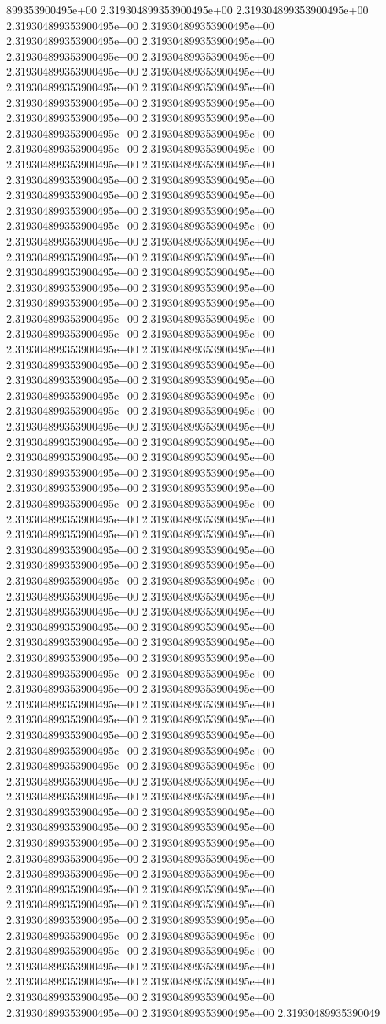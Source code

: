 899353900495e+00	2.319304899353900495e+00	2.319304899353900495e+00	2.319304899353900495e+00	2.319304899353900495e+00	2.319304899353900495e+00	2.319304899353900495e+00	2.319304899353900495e+00	2.319304899353900495e+00	2.319304899353900495e+00	2.319304899353900495e+00	2.319304899353900495e+00	2.319304899353900495e+00	2.319304899353900495e+00	2.319304899353900495e+00	2.319304899353900495e+00	2.319304899353900495e+00	2.319304899353900495e+00	2.319304899353900495e+00	2.319304899353900495e+00	2.319304899353900495e+00	2.319304899353900495e+00	2.319304899353900495e+00	2.319304899353900495e+00	2.319304899353900495e+00	2.319304899353900495e+00	2.319304899353900495e+00	2.319304899353900495e+00	2.319304899353900495e+00	2.319304899353900495e+00	2.319304899353900495e+00	2.319304899353900495e+00	2.319304899353900495e+00	2.319304899353900495e+00	2.319304899353900495e+00	2.319304899353900495e+00	2.319304899353900495e+00	2.319304899353900495e+00	2.319304899353900495e+00	2.319304899353900495e+00	2.319304899353900495e+00	2.319304899353900495e+00	2.319304899353900495e+00	2.319304899353900495e+00	2.319304899353900495e+00	2.319304899353900495e+00	2.319304899353900495e+00	2.319304899353900495e+00	2.319304899353900495e+00	2.319304899353900495e+00	2.319304899353900495e+00	2.319304899353900495e+00	2.319304899353900495e+00	2.319304899353900495e+00	2.319304899353900495e+00	2.319304899353900495e+00	2.319304899353900495e+00	2.319304899353900495e+00	2.319304899353900495e+00	2.319304899353900495e+00	2.319304899353900495e+00	2.319304899353900495e+00	2.319304899353900495e+00	2.319304899353900495e+00	2.319304899353900495e+00	2.319304899353900495e+00	2.319304899353900495e+00	2.319304899353900495e+00	2.319304899353900495e+00	2.319304899353900495e+00	2.319304899353900495e+00	2.319304899353900495e+00	2.319304899353900495e+00	2.319304899353900495e+00	2.319304899353900495e+00	2.319304899353900495e+00	2.319304899353900495e+00	2.319304899353900495e+00	2.319304899353900495e+00	2.319304899353900495e+00	2.319304899353900495e+00	2.319304899353900495e+00	2.319304899353900495e+00	2.319304899353900495e+00	2.319304899353900495e+00	2.319304899353900495e+00	2.319304899353900495e+00	2.319304899353900495e+00	2.319304899353900495e+00	2.319304899353900495e+00	2.319304899353900495e+00	2.319304899353900495e+00	2.319304899353900495e+00	2.319304899353900495e+00	2.319304899353900495e+00	2.319304899353900495e+00	2.319304899353900495e+00	2.319304899353900495e+00	2.319304899353900495e+00	2.319304899353900495e+00	2.319304899353900495e+00	2.319304899353900495e+00	2.319304899353900495e+00	2.319304899353900495e+00	2.319304899353900495e+00	2.319304899353900495e+00	2.319304899353900495e+00	2.319304899353900495e+00	2.319304899353900495e+00	2.319304899353900495e+00	2.319304899353900495e+00	2.319304899353900495e+00	2.319304899353900495e+00	2.319304899353900495e+00	2.319304899353900495e+00	2.319304899353900495e+00	2.319304899353900495e+00	2.319304899353900495e+00	2.319304899353900495e+00	2.319304899353900495e+00	2.319304899353900495e+00	2.319304899353900495e+00	2.319304899353900495e+00	2.319304899353900495e+00	2.319304899353900495e+00	2.319304899353900495e+00	2.319304899353900495e+00	2.319304899353900495e+00	2.319304899353900495e+00	2.319304899353900495e+00	2.319304899353900495e+00	2.319304899353900495e+00	2.319304899353900495e+00	2.31930489935390049